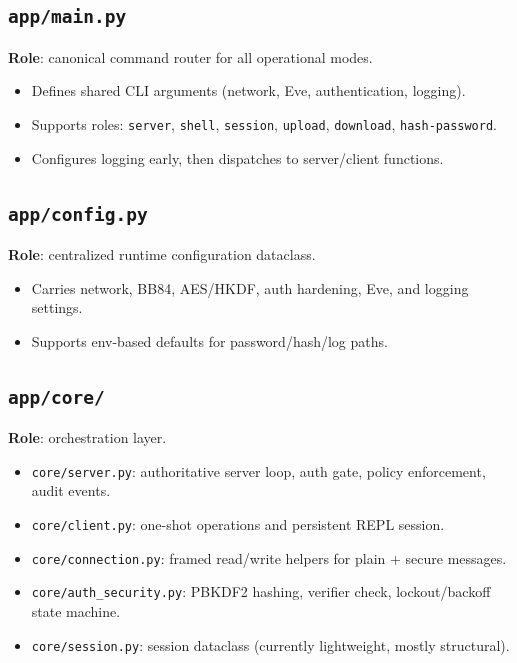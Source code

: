 \documentclass[11pt,a4paper]{article}
\begin{document}
\subsection{\texttt{app/main.py}}
\textbf{Role}: canonical command router for all operational modes.
\begin{itemize}[leftmargin=1.4em]
  \item Defines shared CLI arguments (network, Eve, authentication, logging).
  \item Supports roles: \texttt{server}, \texttt{shell}, \texttt{session}, \texttt{upload}, \texttt{download}, \texttt{hash-password}.
  \item Configures logging early, then dispatches to server/client functions.
\end{itemize}

\subsection{\texttt{app/config.py}}
\textbf{Role}: centralized runtime configuration dataclass.
\begin{itemize}[leftmargin=1.4em]
  \item Carries network, BB84, AES/HKDF, auth hardening, Eve, and logging settings.
  \item Supports env-based defaults for password/hash/log paths.
\end{itemize}

\subsection{\texttt{app/core/}}
\textbf{Role}: orchestration layer.
\begin{itemize}[leftmargin=1.4em]
  \item \texttt{core/server.py}: authoritative server loop, auth gate, policy enforcement, audit events.
  \item \texttt{core/client.py}: one-shot operations and persistent REPL session.
  \item \texttt{core/connection.py}: framed read/write helpers for plain + secure messages.
  \item \texttt{core/auth\_security.py}: PBKDF2 hashing, verifier check, lockout/backoff state machine.
  \item \texttt{core/session.py}: session dataclass (currently lightweight, mostly structural).
\end{itemize}
\end{document}
